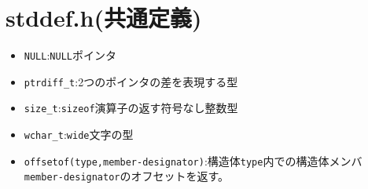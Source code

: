 \section{stddef.h(共通定義)}
\begin{itemize}
\item \verb|NULL|:\verb|NULL|ポインタ
\item \verb|ptrdiff_t|:2つのポインタの差を表現する型
\item \verb|size_t|:\verb|sizeof|演算子の返す符号なし整数型
\item \verb|wchar_t|:\verb|wide|文字の型
\item \verb|offsetof(type,member-designator)|:構造体\verb|type|内での構造体メンバ\\ \verb|member-designator|のオフセットを返す。
\end{itemize}

